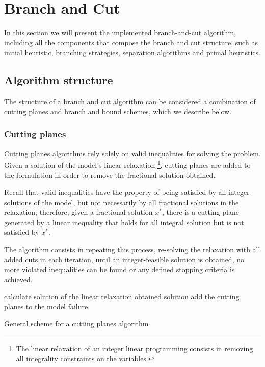 
\section{Branch and Cut}
\label{sec:bnc}

In this section we will present the implemented branch-and-cut algorithm, including all the components that compose the branch and cut structure, such as initial heuristic, branching strategies, separation algorithms and primal heuristics.

\subsection{Algorithm structure}

The structure of a branch and cut algorithm can be considered a combination of cutting planes and branch and bound schemes, which we describe below.

\subsubsection{Cutting planes}

Cutting planes algorithms rely solely on valid inequalities for solving the problem. Given a solution of the model's linear relaxation \footnote{The linear relaxation of an integer linear programming consists in removing all integrality constraints on the variables.}, cutting planes are added to the formulation in order to remove the fractional solution obtained. 

Recall that valid inequalities have the property of being satisfied by all integer solutions of the model, but not necessarily by all fractional solutions in the relaxation; therefore, given a fractional solution $x^*$, there is a cutting plane generated by a linear inequality that holds for all integral solution but is not satisfied by $x^*$. 

The algorithm consists in repeating this process, re-solving the relaxation with all added cuts in each iteration, until an integer-feasible solution is obtained, no more violated inequalities can be found or any defined stopping criteria is achieved.

\begin{algorithm}

\begin{algorithmic}

\LOOP
	\STATE calculate solution of the linear relaxation
		\RETURN obtained solution
		\STATE add the cutting planes to the model
	\ELSE
		\RETURN failure
	\ENDIF	
\ENDLOOP

\caption{General scheme for a cutting planes algorithm}
\label{alg:cuttingplanes}

\end{algorithmic}
\end{algorithm}

